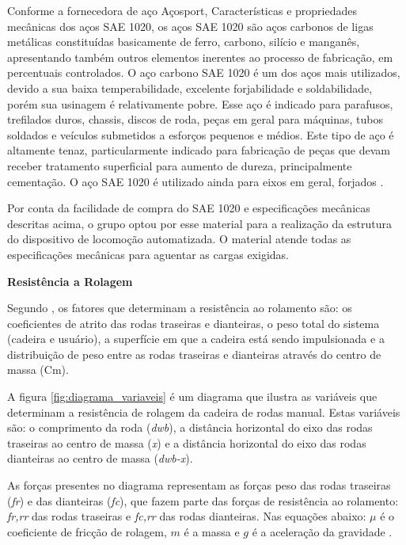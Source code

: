	Conforme a fornecedora de aço Açosport, Características e propriedades mecânicas dos aços SAE 1020, os aços SAE 1020 são aços carbonos de ligas metálicas constituídas basicamente de ferro, carbono, silício e manganês, apresentando também outros elementos inerentes ao processo de fabricação, em percentuais controlados. O aço carbono SAE 1020 é um dos aços mais utilizados, devido a sua baixa temperabilidade, excelente forjabilidade e soldabilidade, porém sua usinagem é relativamente pobre. Esse aço é indicado para parafusos, trefilados duros, chassis, discos de roda, peças em geral para máquinas, tubos soldados e veículos submetidos a esforços pequenos e médios. Este tipo de aço é altamente tenaz, particularmente indicado para fabricação de peças que devam receber tratamento superficial para aumento de dureza, principalmente cementação. O aço SAE 1020 é utilizado ainda para eixos em geral, forjados \cite{acosport}.

	Por conta da facilidade de compra do SAE 1020 e especificações mecânicas descritas acima, o grupo optou por esse material para a realização da estrutura do dispositivo de locomoção automatizada. O material atende todas as especificações mecânicas para aguentar as cargas exigidas.

	\textbf{Resistência a Rolagem}

	Segundo \cite{propulsao_cadeira}, os fatores que determinam a resistência ao rolamento são: os coeficientes de atrito das rodas traseiras e dianteiras, o peso total do sistema (cadeira e usuário), a superfície em que a cadeira está sendo impulsionada e a distribuição de peso entre as rodas traseiras e dianteiras através do centro de massa (Cm).

	A figura \ref{fig:diagrama_variaveis} é um diagrama que ilustra as variáveis que determinam a resistência de rolagem da cadeira de rodas manual. Estas variáveis são: o comprimento da roda (\textit{dwb}), a distância horizontal do eixo das rodas traseiras ao centro de massa (\textit{x}) e a distância horizontal do eixo das rodas dianteiras ao centro de massa (\textit{dwb-x}).

	As forças presentes no diagrama representam as forças peso das rodas traseiras (\textit{fr}) e das dianteiras (\textit{fc}), que fazem parte das forças de resistência ao rolamento: \textit{fr,rr} das rodas traseiras e \textit{fc,rr} das rodas dianteiras. Nas equações abaixo: $\mu$ é o coeficiente de fricção de rolagem, $m$ é a massa e $g$ é a aceleração da gravidade \cite{propulsao_cadeira}.

